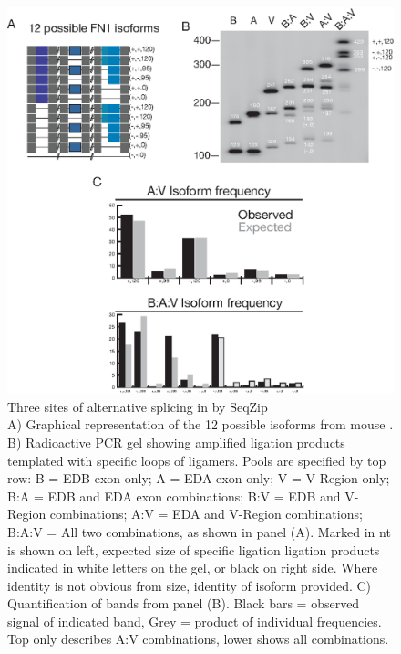     \begin{figure} %
            \centering 
            \includegraphics{Figures/SeqZipMethod/fn1ThreeSite.eps}
            \caption[Three sites of alternative splicing in \fn{} by SeqZip]
            {
              Three sites of alternative splicing in \fn{} by SeqZip\\[0.25cm]
              A) Graphical representation of the 12 possible isoforms from mouse \fn{}. B) Radioactive PCR gel showing amplified ligation products templated with specific loops of ligamers. Pools are specified by top row: B = EDB exon only; A = EDA exon only; V = V-Region only; B:A = EDB and EDA exon combinations; B:V = EDB and V-Region combinations; A:V = EDA and V-Region combinations; B:A:V = All two combinations, as shown in panel (A). Marked in nt is shown on left, expected size of specific ligation ligation products indicated in white letters on the gel, or black on right side. Where identity is not obvious from size, identity of isoform provided. C) Quantification of bands from panel (B). Black bars = observed signal of indicated band, Grey = product of individual frequencies. Top only describes A:V combinations, lower shows all combinations.
              }
            \label{SeqZipMethod:fig:Three Site FN1 by SeqZip}
            \end{figure}

